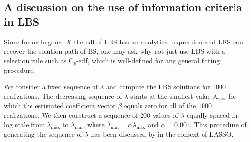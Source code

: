 


\subsection{A discussion on the use of information criteria in LBS}
Since for orthogonal $X$ the edf of LBS has an analytical expression and LBS can recover the solution path of BS, one may ask why not just use LBS with a selection rule such as C$_p$-edf, which is well-defined for any general fitting procedure. 

We consider a fixed sequence of $\lambda$ and compute the LBS solutions for $1000$ realizations. The decreasing sequence of $\lambda$ starts at the smallest value $\lambda_{\text{max}}$ for which the estimated coefficient vector $\hat{\beta}$ equals zero for all of the $1000$ realizations. We then construct a sequence of $200$ values of $\lambda$ equally spaced in log scale from $\lambda_{\text{max}}$ to $\lambda_{\text{min}}$, where $\lambda_{\text{min}} = \alpha \lambda_{\text{max}}$ and $\alpha=0.001$. This procedure of generating the sequence of $\lambda$ has been discussed by \citet{Friedman2010} in the context of LASSO.


